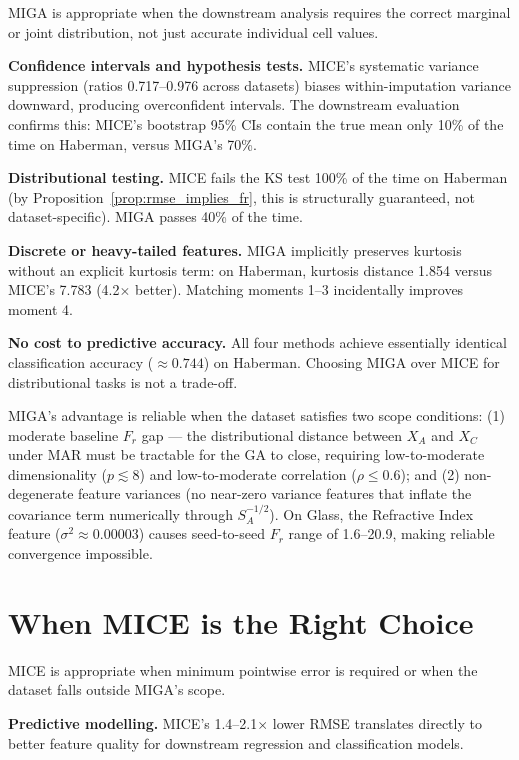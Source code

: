 MIGA is appropriate when the downstream analysis requires the correct marginal or joint distribution, not just accurate individual cell values.

\textbf{Confidence intervals and hypothesis tests.} MICE's systematic variance suppression (ratios 0.717--0.976 across datasets) biases within-imputation variance downward, producing overconfident intervals. The downstream evaluation confirms this: MICE's bootstrap 95\% CIs contain the true mean only 10\% of the time on Haberman, versus MIGA's 70\%.

\textbf{Distributional testing.} MICE fails the KS test 100\% of the time on Haberman (by Proposition~\ref{prop:rmse_implies_fr}, this is structurally guaranteed, not dataset-specific). MIGA passes 40\% of the time.

\textbf{Discrete or heavy-tailed features.} MIGA implicitly preserves kurtosis without an explicit kurtosis term: on Haberman, kurtosis distance 1.854 versus MICE's 7.783 (4.2$\times$ better). Matching moments 1--3 incidentally improves moment 4.

\textbf{No cost to predictive accuracy.} All four methods achieve essentially identical classification accuracy ($\approx 0.744$) on Haberman. Choosing MIGA over MICE for distributional tasks is not a trade-off.

MIGA's advantage is reliable when the dataset satisfies two scope conditions: (1) moderate baseline $F_r$ gap --- the distributional distance between $X_A$ and $X_C$ under MAR must be tractable for the GA to close, requiring low-to-moderate dimensionality ($p \lesssim 8$) and low-to-moderate correlation ($\rho \leq 0.6$); and (2) non-degenerate feature variances (no near-zero variance features that inflate the covariance term numerically through $S_A^{-1/2}$). On Glass, the Refractive Index feature ($\sigma^2 \approx 0.00003$) causes seed-to-seed $F_r$ range of 1.6--20.9, making reliable convergence impossible.

\section{When MICE is the Right Choice}

MICE is appropriate when minimum pointwise error is required or when the dataset falls outside MIGA's scope.

\textbf{Predictive modelling.} MICE's 1.4--2.1$\times$ lower RMSE translates directly to better feature quality for downstream regression and classification models.

